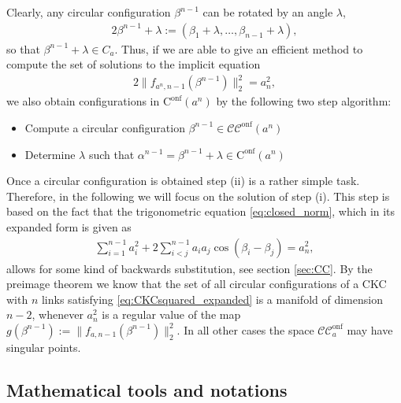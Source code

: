 \documentclass[10pt,a4paper]{article}
\theoremstyle{definition}
\theoremstyle{remark}
\numberwithin{equation}{section}
\newcommand{\Cc}{\mathcal{CC}^{\mathrm{onf}}}
\newcommand{\Cs}{\mathrm{C}^{\mathrm{onf}}}
\begin{document}
Clearly, any circular configuration $\beta^{n-1}$ can be rotated by an angle $\lambda$,   
\begin{alignat*}{2}
\beta^{n-1} + \lambda := \left( \beta_1 + \lambda, \dots , \beta_{n-1} +\lambda  \right),  
\end{alignat*} 
so that $\beta^{n-1} + \lambda  \in C_a $. Thus, if we are able to give an efficient method  to compute the set of solutions to the implicit equation   
\begin{alignat}{2}\label{eq:closed_norm}
\|f_{a^n, n-1} \left(\beta^{n-1}	\right) \|^2_2  = a_n^2, 
\end{alignat}
we also obtain configurations in $\Cs(a^n)$ by the following two step algorithm:
\begin{itemize}
\item[(i)]   Compute a circular configuration  $\beta^{n-1} \in \Cc({a^n})$
\item[(ii)]  Determine $\lambda$ such that  $\alpha^{n-1} =  \beta^{n-1} + \lambda  \in \Cs({a^n})$ 
\end{itemize}
Once a circular configuration is obtained step (ii) is a rather simple task. Therefore, in the following we will focus on the solution of step (i). This step is based on the fact that the trigonometric equation \eqref{eq:closed_norm}, which in its expanded form is given as    
\begin{align}\label{eq:CKCsquared_expanded}
\sum_{i=1}^{n-1} a_i^2 + 2 \sum_{i<j}^{n-1} a_i a_j 
\cos(\beta_i -\beta_j) = a_n^2 , 
\end{align}
allows for some kind of backwards substitution, see section \ref{sec:CC}. By the preimage theorem we know that the set of all circular configurations of a CKC with $n$ links satisfying  \eqref{eq:CKCsquared_expanded} is a manifold of dimension $n-2$, whenever $a_n^2$ is a regular value of the map $g \left(\beta^{n-1} \right)  := \| f_{a, n-1}\left( \beta^{n-1} \right)    \|^2_2$. In all other cases the space $\Cc_{a}$ may have singular points.


\subsection{Mathematical tools and notations}\label{sec:noation}
\end{document}
